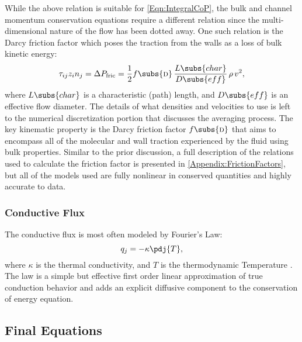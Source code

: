 While the above relation is suitable for \cref{Eqn:IntegralCoP}, the bulk and channel momentum conservation equations require a different relation since the multi-dimensional nature of the flow has been dotted away.
One such relation is the Darcy friction factor which poses the traction from the walls as a loss of bulk kinetic energy:
\begin{equation}
    \tau_{ij} z_i n_j = \Delta{P}_{\text{fric}} = \frac{1}{2}
        f\subs{\textsc{d}}\,\frac{L\subs{char}}{D\subs{eff}}\,\rho\,v^2,
\end{equation}
where $L\subs{char}$ is a characteristic (path) length, and $D\subs{eff}$ is an effective flow diameter.
The details of what densities and velocities to use is left to the numerical discretization portion that discusses the averaging process.
The key kinematic property is the Darcy friction factor $f\subs{\textsc{d}}$ that aims to encompass all of the molecular and wall traction experienced by the fluid using bulk properties.
Similar to the prior  discussion, a full description of the relations used to calculate the friction factor is presented in \cref{Appendix:FrictionFactors}, but all of the models used are fully nonlinear in conserved quantities and highly accurate to data.


\subsubsection{Conductive Flux}

The conductive flux is most often modeled by Fourier's Law:
\begin{equation}
    q_j = - \kappa \pdj{T},
\end{equation}
where $\kappa$ is the thermal conductivity, and $T$ is the thermodynamic Temperature \cite{incropera_introduction_2006}.
The law is a simple but effective first order linear approximation of true conduction behavior and adds an explicit diffusive component to the conservation of energy equation.

\subsection{Final Equations}

